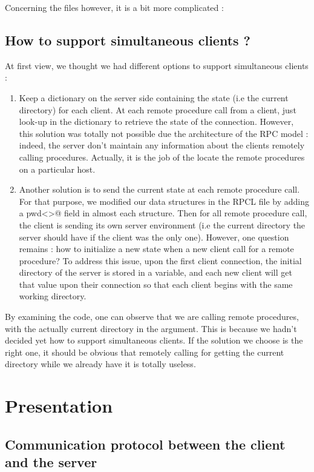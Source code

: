 \documentclass{article}
\begin{document}
Concerning the files however, it is a bit more complicated : 


\subsection{How to support simultaneous clients ?}
At first view, we thought we had different options to support simultaneous clients :
\begin{enumerate}
\item Keep a dictionary on the server side containing the state (i.e the current directory) for each client. At each remote procedure call from a client, just look-up in the dictionary to retrieve the state of the connection. However, this solution was totally not possible due the architecture of the RPC model : indeed, the server don't maintain any information about the clients remotely calling procedures. Actually, it is the job of the \verb@PortMapper@ locate the remote procedures on a particular host.
\item Another solution is to send the current state at each remote procedure call. For that purpose, we modified our data structures in the RPCL file by adding a \verb@string pwd<>@ field in almost each structure. Then for all remote procedure call, the client is sending its own server environment (i.e the current directory the server should have if the client was the only one). However, one question remains : how to initialize a new state when a new client call for a remote procedure? To address this issue, upon the first client connection, the initial directory of the server is stored in a variable, and each new client will get that value upon their connection so that each client begins with the same working directory.
\end{enumerate}
By examining the code, one can observe that we are calling \verb@PWD@ remote procedures, with the actually current directory in the argument. This is because we hadn't decided yet how to support simultaneous clients. If the solution we choose is the right one, it should be obvious that remotely calling for getting the current directory while we already have it is totally useless.

\section{Presentation}
\subsection{Communication protocol between the client and the server}
\end{document}
